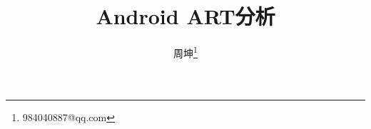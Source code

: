 \documentclass[a4paper,11pt,titlepage]{ctexart}
\begin{document}
\title{{Android ART分析}}
\author{周坤\thanks{984040887@qq.com}}

\maketitle
\tableofcontents
\setcounter{tocdepth}{3}
\newpage





\end{document}
